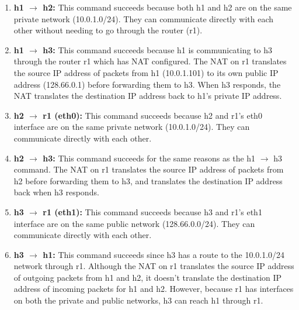 \begin{enumerate}
  \item \textbf{h1 $\rightarrow$ h2:} This command succeeds because both h1 and h2 are on the same private network (10.0.1.0/24). They can communicate directly with each other without needing to go through the router (r1).

  \item \textbf{h1 $\rightarrow$ h3:} This command succeeds because h1 is communicating to h3 through the router r1 which has NAT configured. The NAT on r1 translates the source IP address of packets from h1 (10.0.1.101) to its own public IP address (128.66.0.1) before forwarding them to h3. When h3 responds, the NAT translates the destination IP address back to h1's private IP address.

  \item \textbf{h2 $\rightarrow$ r1 (eth0):} This command succeeds because h2 and r1's eth0 interface are on the same private network (10.0.1.0/24). They can communicate directly with each other.

  \item \textbf{h2 $\rightarrow$ h3:} This command succeeds for the same reasons as the h1 $\rightarrow$ h3 command. The NAT on r1 translates the source IP address of packets from h2 before forwarding them to h3, and translates the destination IP address back when h3 responds.

  \item \textbf{h3 $\rightarrow$ r1 (eth1):} This command succeeds because h3 and r1's eth1 interface are on the same public network (128.66.0.0/24). They can communicate directly with each other.

  \item \textbf{h3 $\rightarrow$ h1:} This command succeeds since h3 has a route to the 10.0.1.0/24 network through r1. Although the NAT on r1 translates the source IP address of outgoing packets from h1 and h2, it doesn't translate the destination IP address of incoming packets for h1 and h2. However, because r1 has interfaces on both the private and public networks, h3 can reach h1 through r1.
\end{enumerate}

